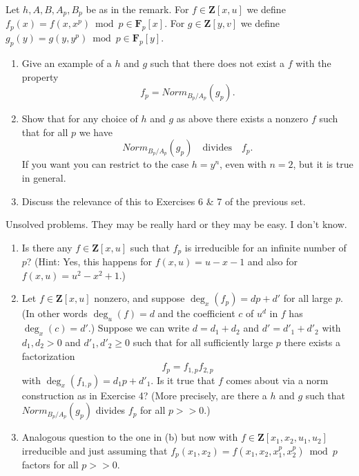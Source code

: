 \begin{exercise}
\label{exercise-strange-fp-3}
Let $h, A, B, A_p, B_p$ be as in the remark. For $f \in {\mathbf Z}[x, u]$ we
define $f_p(x) = f(x, x^p) \bmod p \in {\mathbf F}_p[x]$. For
$g \in {\mathbf Z}[y, v]$ we define
$g_p(y) = g(y, y^p) \bmod p \in {\mathbf F}_p[y]$.
\begin{enumerate}
\item Give an example of a $h$ and $g$ such that
there does not exist a $f$ with the property
$$
f_p  =  Norm_{B_p/A_p}(g_p).
$$
\item Show that for any choice of $h$ and $g$ as above
there exists a nonzero $f$ such that for all $p$ we have
$$
Norm_{B_p/A_p}(g_p)\quad\text{divides}\quad f_p .
$$
If you want you can restrict to the case $h = y^n$, even with $n = 2$,
but it is true in general.
\item Discuss the relevance of this to Exercises 6 \& 7 of the previous
set.
\end{enumerate}
\end{exercise}

\begin{exercise}
\label{exercise-strange-fp-unsolved}
Unsolved problems. They may be really hard or they may be easy.
I don't know.
\begin{enumerate}
\item Is there any $f \in {\mathbf Z}[x, u]$ such that $f_p$ is
irreducible for an infinite number of $p$? (Hint: Yes, this happens for
$f(x, u) = u - x - 1$ and also for $f(x, u) = u^2 - x^2 + 1$.)
\item Let $f \in {\mathbf Z}[x, u]$ nonzero, and suppose
$\deg_x(f_p) = dp + d'$ for all large $p$. (In other words $\deg_u(f) = d$
and the coefficient $c$ of $u^d$ in $f$ has $\deg_x(c) = d'$.) Suppose we
can write $d = d_1 + d_2$ and $d' = d'_1 + d'_2$ with $d_1, d_2 > 0$
and $d'_1, d'_2 \geq 0$ such that for all sufficiently large $p$
there exists a factorization
$$
f_p = f_{1, p} f_{2, p}
$$
with $\deg_x(f_{1, p}) = d_1p + d'_1$. Is it true that $f$ comes about via a
norm construction as in Exercise 4? (More precisely, are there a $h$ and
$g$ such that $Norm_{B_p/A_p}(g_p)$ divides $f_p$ for all $p >> 0$.)
\item Analogous question to the one in (b) but now with
$f \in {\mathbf Z}[x_1, x_2, u_1, u_2]$ irreducible and just assuming that
$f_p(x_1, x_2) = f(x_1, x_2, x_1^p, x_2^p) \bmod p$ factors for all
$p >> 0$.
\end{enumerate}
\end{exercise}


















